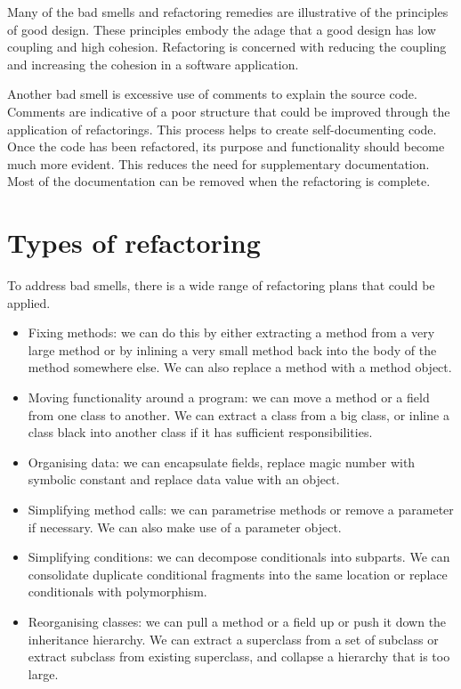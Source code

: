 \documentclass[a4paper, openany]{memoir}
\begin{document}
Many of the bad smells and refactoring remedies are illustrative of the principles of good design. These principles embody the adage that a good design has low coupling and high cohesion. Refactoring is concerned with reducing the coupling and increasing the cohesion in a software application.

Another bad smell is excessive use of comments to explain the source code. Comments are indicative of a poor structure that could be improved through the application of refactorings. This process helps to create self-documenting code. Once the code has been refactored, its purpose and functionality should become much more evident. This reduces the need for supplementary documentation. Most of the documentation can be removed when the refactoring is complete.

\section{Types of refactoring}
To address bad smells, there is a wide range of refactoring plans that could be applied. 
\begin{itemize}
    \item Fixing methods: we can do this by either extracting a method from a very large method or by inlining a very small method back into the body of the method somewhere else. We can also replace a method with a method object.
    \item Moving functionality around a program: we can move a method or a field from one class to another. We can extract a class from a big class, or inline a class black into another class if it has sufficient responsibilities.
    \item Organising data: we can encapsulate fields, replace magic number with symbolic constant and replace data value with an object.
    \item Simplifying method calls: we can parametrise methods or remove a parameter if necessary. We can also make use of a parameter object.
    \item Simplifying conditions: we can decompose conditionals into subparts. We can consolidate duplicate conditional fragments into the same location or replace conditionals with polymorphism.
    \item Reorganising classes: we can pull a method or a field up or push it down the inheritance hierarchy. We can extract a superclass from a set of subclass or extract subclass from existing superclass, and collapse a hierarchy that is too large.
\end{itemize}
\end{document}
